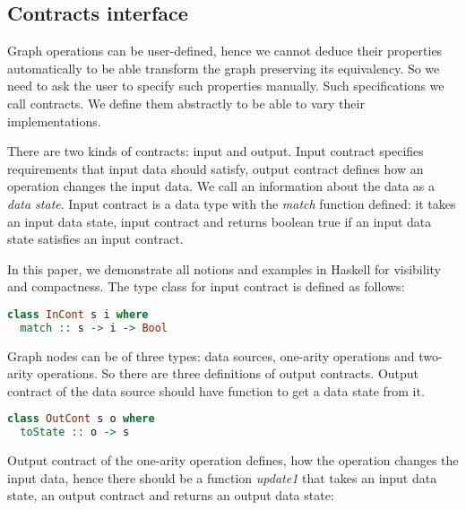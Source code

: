 
\subsection{Contracts interface}


Graph operations can be user-defined, hence we cannot deduce their properties automatically to be able transform the graph preserving its equivalency.
So we need to ask the user to specify such properties manually.
Such specifications we call contracts.
We define them abstractly to be able to vary their implementations.

There are two kinds of contracts: input and output.
Input contract specifies requirements that input data should satisfy, output contract defines how an operation changes the input data.
We call an information about the data as a {\em data state}.
Input contract is a data type with the {\em match} function defined: it takes an input data state, input contract and returns boolean true if an input data state satisfies an input contract.

In this paper, we demonstrate all notions and examples in Haskell for visibility and compactness. The type class for input contract is defined as follows:

\begin{lstlisting}[language=Haskell]
class InCont s i where
  match :: s -> i -> Bool
\end{lstlisting}

Graph nodes can be of three types: data sources, one-arity operations and two-arity operations.
So there are three definitions of output contracts.
Output contract of the data source should have function to get a data state from it.

\begin{lstlisting}[language=Haskell]
class OutCont s o where
  toState :: o -> s
\end{lstlisting}

Output contract of the one-arity operation defines, how the operation changes the input data, hence there should be a function {\em update1} that takes an input data state, an output contract and returns an output data state:

